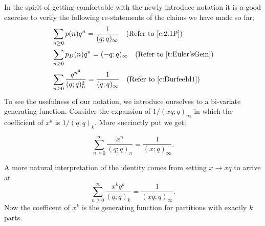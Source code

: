 \raggedbottom
In the spirit of getting comfortable with the newly introduce notation it is a good exercise to verify the following re-statements of the claims we have made so far;
\begin{align*}
    &\sum_{n \geq 0} p(n) q^n = \dfrac{1}{(q;q)_\infty} \quad (\text{Refer to } \cref{c:2.1P}) \\
    &\sum_{n \geq 0} p_D(n) q^n = (-q;q)_\infty \quad (\text{Refer to } \cref{t:Euler'sGem}) \\
    &\sum_{n \geq 0} \dfrac{q^{n^2}}{(q;q)_n^2} =\dfrac{1}{(q;q)_\infty}\quad (\text{Refer to } \cref{c:DurfeeId1})
\end{align*}
To see the usefulness of our notation, we introduce ourselves to a bi-variate generating function. Consider the expansion of $1/(xq;q)_\infty$ in which the coefficient of $x^k$ is $1/(q;q)_k$. More succinctly put we get;
\begin{claim}
\[\sum_{n\geq 0}^\infty\dfrac{x^n}{(q;q)_n} = \dfrac{1}{(x;q)_\infty}.\]
\end{claim}
A more natural interpretation of the identity comes from setting $x\to xq$ to arrive at
\[
\sum_{n\geq 0}^\infty \dfrac{x^kq^k}{(q;q)_k} = \dfrac{1}{(xq;q)_\infty}.
\]
Now the coefficent of $x^k$ is the generating function for partitions with exactly $k$ parts. 
\endinput

